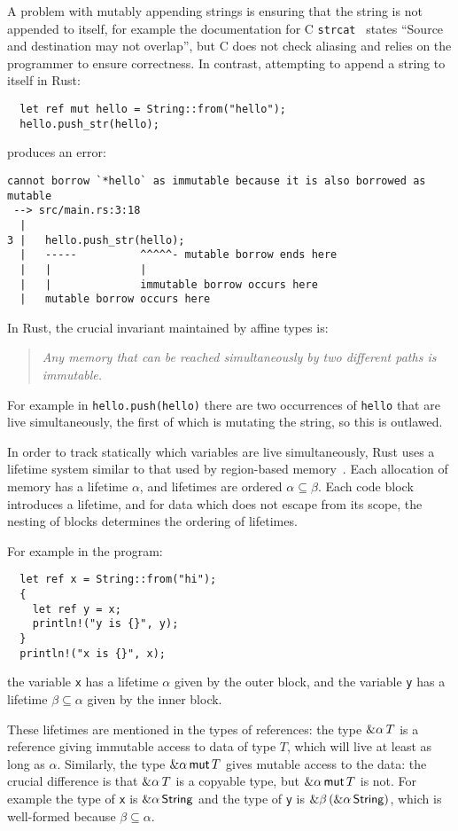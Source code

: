 A problem with mutably appending strings is ensuring that the string
is not appended to itself, for example the documentation for
C \verb|strcat|~\cite{strcat} states ``Source and destination may not
overlap'', but C does not check aliasing and relies on the programmer
to ensure correctness. In contrast, attempting to append a string
to itself in Rust:
\begin{verbatim}
  let ref mut hello = String::from("hello");
  hello.push_str(hello);
\end{verbatim}
produces an error:
\begin{verbatim}
cannot borrow `*hello` as immutable because it is also borrowed as mutable
 --> src/main.rs:3:18
  |
3 |   hello.push_str(hello);
  |   -----          ^^^^^- mutable borrow ends here
  |   |              |
  |   |              immutable borrow occurs here
  |   mutable borrow occurs here
\end{verbatim}
In Rust, the crucial invariant maintained by affine types is:
\begin{quote}\em
  Any memory that can be reached simultaneously by two different paths
  is immutable.
\end{quote}
For example in \verb|hello.push(hello)| there are two occurrences of \verb|hello| that
are live simultaneously, the first of which is mutating the string, so this is outlawed.

In order to track statically which variables are live simultaneously, Rust uses a lifetime
system similar to that used by region-based memory~\cite{regions}. Each allocation of
memory has a lifetime $\alpha$, and lifetimes are ordered $\alpha\subseteq\beta$.
Each code block introduces a lifetime, and for data which does not escape from its scope,
the nesting of blocks determines the ordering of lifetimes.

For example in the program:
\begin{verbatim}
  let ref x = String::from("hi");
  {
    let ref y = x;
    println!("y is {}", y);
  }
  println!("x is {}", x);
\end{verbatim}
the variable \verb|x| has a lifetime $\alpha$ given by the outer block,
and the variable \verb|y| has a lifetime $\beta\subseteq\alpha$ given by the inner block.

These lifetimes are mentioned in the types of references: the type $\&\alpha\, T$
is a reference giving immutable access to data of type $T$, which will live at least as long as
$\alpha$. Similarly, the type $\&\alpha\,\mathsf{mut}\, T$ gives mutable access to the data: the crucial
difference is that $\&\alpha\, T$ is a copyable type, but $\&\alpha\,\mathsf{mut}\, T$ is not.
For example
the type of \verb|x| is $\&\alpha\,\mathsf{String}$ and the type of \verb|y| is
$\&\beta\,(\&\alpha\,\mathsf{String})$, which is well-formed because $\beta\subseteq\alpha$.

